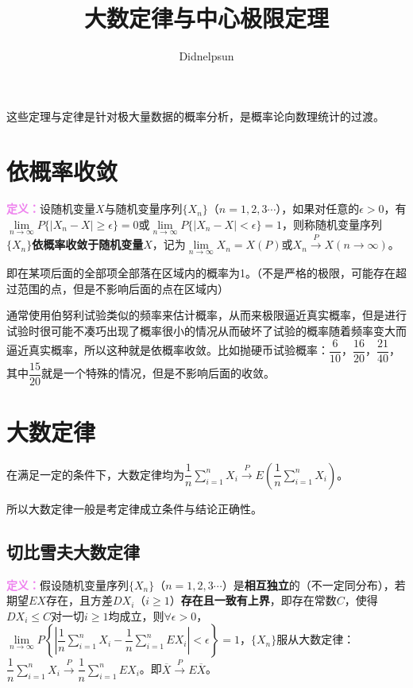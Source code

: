 \documentclass[UTF8, 12pt]{ctexart}
\author{Didnelpsun}
\title{大数定律与中心极限定理}
\date{}
\begin{document}
\maketitle
\pagestyle{empty}
\thispagestyle{empty}
\tableofcontents
\thispagestyle{empty}
\newpage
\pagestyle{plain}
\setcounter{page}{1}

这些定理与定律是针对极大量数据的概率分析，是概率论向数理统计的过渡。

\section{依概率收敛}

\textcolor{violet}{\textbf{定义：}}设随机变量$X$与随机变量序列$\{X_n\}$（$n=1,2,3\cdots$），如果对任意的$\epsilon>0$，有$\lim\limits_{n\to\infty}P\{\vert X_n-X\vert\geqslant\epsilon\}=0$或$\lim\limits_{n\to\infty}P\{\vert X_n-X\vert<\epsilon\}=1$，则称随机变量序列$\{X_n\}$\textbf{依概率收敛于随机变量$X$}，记为$\lim\limits_{n\to\infty}X_n=X(P)$或$X_n\overset{P}{\rightarrow}X(n\to\infty)$。

即在某项后面的全部项全部落在区域内的概率为1。（不是严格的极限，可能存在超过范围的点，但是不影响后面的点在区域内）

通常使用伯努利试验类似的频率来估计概率，从而来极限逼近真实概率，但是进行试验时很可能不凑巧出现了概率很小的情况从而破坏了试验的概率随着频率变大而逼近真实概率，所以这种就是依概率收敛。比如抛硬币试验概率：$\dfrac{6}{10}$，$\dfrac{16}{20}$，$\dfrac{21}{40}$，其中$\dfrac{15}{20}$就是一个特殊的情况，但是不影响后面的收敛。

\section{大数定律}

在满足一定的条件下，大数定律均为$\dfrac{1}{n}\sum\limits_{i=1}^nX_i\overset{P}{\rightarrow}E\left(\dfrac{1}{n}\sum\limits_{i=1}^nX_i\right)$。

所以大数定律一般是考定律成立条件与结论正确性。

\subsection{切比雪夫大数定律}

\textcolor{violet}{\textbf{定义：}}假设随机变量序列$\{X_n\}$（$n=1,2,3\cdots$）是\textbf{相互独立}的（不一定同分布），若期望$EX$存在，且方差$DX_i$（$i\geqslant1$）\textbf{存在且一致有上界}，即存在常数$C$，使得$DX_i\leqslant C$对一切$i\geqslant1$均成立，则$\forall\epsilon>0$，$\lim\limits_{n\to\infty}P\left\{\left\vert\dfrac{1}{n}\sum\limits_{i=1}^nX_i-\dfrac{1}{n}\sum\limits_{i=1}^nEX_i\right\vert<\epsilon\right\}=1$，$\{X_n\}$服从大数定律：$\dfrac{1}{n}\sum\limits_{i=1}^nX_i\overset{P}{\longrightarrow}\dfrac{1}{n}\sum\limits_{i=1}^nEX_i$。即$\overline{X}\overset{P}{\rightarrow}E\overline{X}$。
\end{document}
